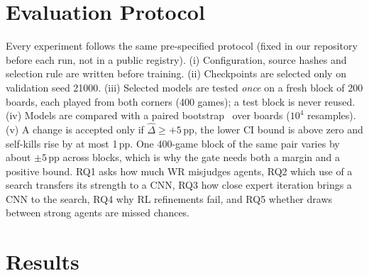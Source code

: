 \documentclass[journal]{IEEEtran}
\newcommand{\pp}{\,pp}
\begin{document}
\section{Evaluation Protocol}
\label{sec:protocol}

Every experiment follows the same pre-specified protocol (fixed in our repository before each run, not in a public registry). (i) Configuration, source hashes and selection rule are written before training. (ii) Checkpoints are selected only on validation seed 21000. (iii) Selected models are tested \emph{once} on a fresh block of 200 boards, each played from both corners (400 games); a test block is never reused. (iv) Models are compared with a paired bootstrap~\cite{efron1979bootstrap} over boards ($10^4$ resamples). (v) A change is accepted only if $\hat\Delta\ge+5$\pp{}, the lower CI bound is above zero and self-kills rise by at most 1\pp{}. One 400-game block of the same pair varies by about $\pm5$\pp{} across blocks, which is why the gate needs both a margin and a positive bound. RQ1 asks how much WR misjudges agents, RQ2 which use of a search transfers its strength to a CNN, RQ3 how close expert iteration brings a CNN to the search, RQ4 why RL refinements fail, and RQ5 whether draws between strong agents are missed chances.

\section{Results}
\end{document}
